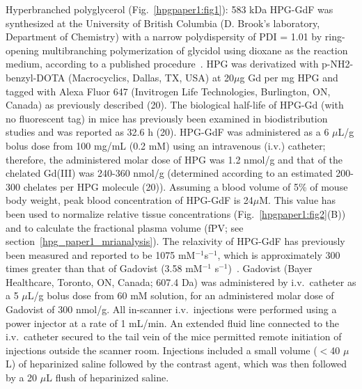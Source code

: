 Hyperbranched polyglycerol (Fig.~\ref{hpgpaper1:fig1}): 583 \acs{kDa} \acs{HPG-GdF} was synthesized at the University of British Columbia (D. Brook's laboratory, Department of Chemistry) with a narrow polydispersity of PDI = 1.01 by ring-opening multibranching polymerization of glycidol using dioxane as the reaction medium, according to a published procedure~\cite{Kainthan:2006ce}.
HPG was derivatized with p-NH2-benzyl-DOTA (Macrocyclics, Dallas, TX, USA) at 20$\mu$g Gd per mg HPG and tagged with Alexa Fluor 647 (Invitrogen Life Technologies, Burlington, ON, Canada) as previously described (20).
The biological half-life of HPG-Gd (with no fluorescent tag) in mice has previously been examined in biodistribution studies and was reported as 32.6 h (20).
HPG-GdF was administered as a 6 $\mu$L/g bolus dose from 100 mg/mL (0.2 mM) using an intravenous (i.v.) catheter; therefore, the administered molar dose of HPG was 1.2 nmol/g and that of the chelated Gd(III) was 240-360 nmol/g (determined according to an estimated 200-300 chelates per HPG molecule (20)).
Assuming a blood volume of 5\% of mouse body weight, peak blood concentration of \acs{HPG-GdF} is 24$\mu$M.
This value has been used to normalize relative tissue concentrations (Fig.~\ref{hpgpaper1:fig2}(B)) and to calculate the fractional plasma volume (\acs{fPV}; see section~\ref{hpg_paper1_mrianalysis}).
The relaxivity of \acs{HPG-GdF} has previously been measured and reported to be 1075 mM$^{-1}$s$^{-1}$, which is approximately 300 times greater than that of Gadovist (3.58 mM$^{-1}$ s$^{-1}$)~\cite{Saatchi:2012hc}.
Gadovist (Bayer Healthcare, Toronto, ON, Canada; 607.4 \acs{Da}) was administered by i.v.\ catheter as a 5 $\mu$L/g bolus dose from 60 mM solution, for an administered molar dose of Gadovist of 300 nmol/g.
All in-scanner i.v.\ injections were performed using a power injector at a rate of 1 mL/min.
An extended fluid line connected to the i.v.\ catheter secured to the tail vein of the mice permitted remote initiation of injections outside the scanner room.
Injections included a small volume ($<$40 $\mu$L) of heparinized saline followed by the contrast agent, which was then followed by a 20 $\mu$L flush of heparinized saline.

